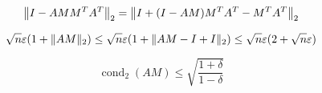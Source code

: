 \documentclass[paper=A4, fontsize=11pt]{scrartcl}
\let\originalleft\left
\let\originalright\right
\renewcommand{\left}{\mathopen{}\mathclose\bgroup\originalleft}
\renewcommand{\right}{\aftergroup\egroup\originalright}
\begin{document}
\begin{equation}
\left\|I-A M M^{T} A^{T}\right\|_{2}=\left\|I+(I-A M) M^{T} A^{T}-M^{T} A^{T}\right\|_{2}
\end{equation}

\begin{equation}
\sqrt{n} \varepsilon\left(1+\|A M\|_{2}\right) \leq \sqrt{n} \varepsilon\left(1+\|A M-I+I\|_{2}\right) \leq \sqrt{n} \varepsilon(2+\sqrt{n} \varepsilon)
\end{equation}

\begin{equation}
\operatorname{cond}_{2}(A M) \leq \sqrt{\frac{1+\delta}{1-\delta}}
\end{equation}
\end{document}
